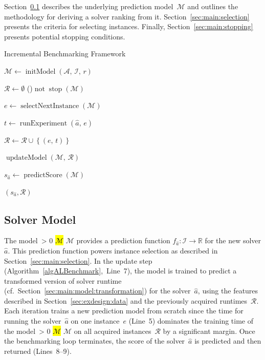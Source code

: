 \documentclass[sn-basic, Numbered]{sn-jnl} %
\newcommand{\showchanges}{1} %
\newcommand{\change}[1]{\ifnum \showchanges > 0 \sethlcolor{yellow}\hl{#1} \else #1 \fi}
\begin{document}
Section~\ref{sec:main:model} describes the underlying prediction model~$\mathcal{M}$ and outlines the methodology for deriving a solver ranking from it.
Section~\ref{sec:main:selection} presents the criteria for selecting instances.
Finally, Section~\ref{sec:main:stopping} presents potential stopping conditions.

\begin{algorithm}[t]
  \caption{Incremental Benchmarking Framework}
  \label{algALBenchmark}


  \BlankLine

  $\mathcal{M} \leftarrow \operatorname{initModel}\left(\mathcal{A},\, \mathcal{I},\, r\right)$ 
  
  \BlankLine
  $\mathcal{R} \leftarrow \emptyset$ \;
  \While(){$\operatorname{not} \operatorname{stop}\left(\mathcal{M}\right)$}{
    $e \leftarrow \operatorname{selectNextInstance}\left(\mathcal{M}\right)$ 

    $t \leftarrow \operatorname{runExperiment}\left(\hat{a},\,  e\right)$  

    $\mathcal{R} \leftarrow \mathcal{R} \cup \left\lbrace (e,\, t) \right\rbrace$

    \BlankLine
    $\operatorname{updateModel}\left(\mathcal{M},\, \mathcal{R}\right)$ 
  }
  $s_{\hat a} \leftarrow \operatorname{predictScore}(\mathcal{M})$ 
  
  \BlankLine
  \Return $(s_{\hat a}, \mathcal{R})$
\end{algorithm}


\subsection{Solver Model}
\label{sec:main:model}

The model~\change{$\mathcal{M}$} provides a prediction function $f_{\hat a} : \mathcal{I} \rightarrow \mathbb{R}$ for the new solver $\hat a$.
This prediction function powers instance selection as described in Section~\ref{sec:main:selection}.
In the update step (Algorithm~\ref{algALBenchmark},~Line~7), the model is trained to predict a transformed version of solver runtime (cf.~Section~\ref{sec:main:model:transformation}) for the solver~$\hat{a}$, using the features described in Section~\ref{sec:exdesign:data} and the previously acquired runtimes~$\mathcal{R}$.
Each iteration trains a new prediction model from scratch since the time for running the solver~$\hat{a}$ on one instance~$e$ (Line~5) dominates the training time of the model~\change{$\mathcal{M}$} on all acquired instances~$\mathcal{R}$ by a significant margin.
Once the benchmarking loop terminates, the score of the solver~$\hat{a}$ is predicted and then returned (Lines~8--9).
\end{document}
